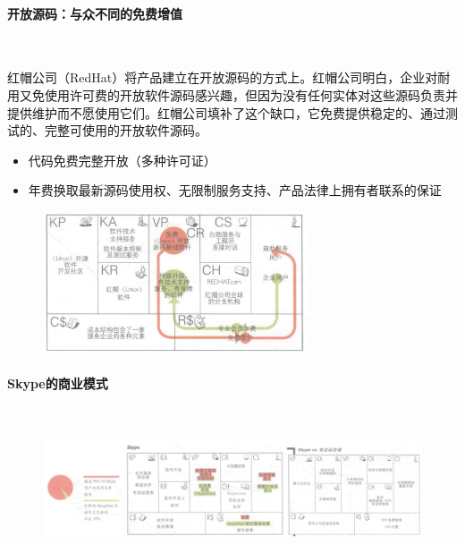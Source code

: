     \paragraph{开放源码：与众不同的免费增值}~{}

    红帽公司（RedHat）将产品建立在开放源码的方式上。红帽公司明白，企业对耐用又免使用许可费的开放软件源码感兴趣，但因为没有任何实体对这些源码负责并提供维护而不愿使用它们。红帽公司填补了这个缺口，它免费提供稳定的、通过测试的、完整可使用的开放软件源码。
    \begin{itemize}
        \item 代码免费完整开放（多种许可证）
        \item 年费换取最新源码使用权、无限制服务支持、产品法律上拥有者联系的保证    
    \end{itemize}
    \begin{figure}[H]
		\centering
        \vspace{-0.5em}
		\includegraphics[width=0.7\textwidth]{img/RedHat的商业模式.png}
        \vspace{-0.5em}
	\end{figure}

    \paragraph{Skype的商业模式}~{}


    \begin{figure}[H]
		\centering
        \vspace{-0.5em}
		\includegraphics[width=\textwidth]{img/Skype的商业模式.png}
        \vspace{-0.5em}
	\end{figure}

